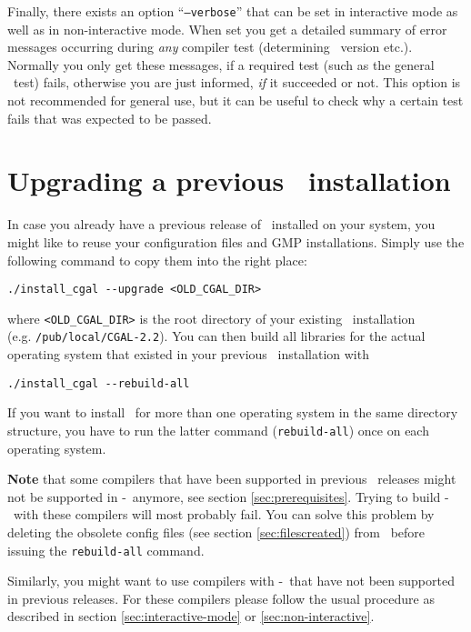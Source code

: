 Finally, there exists an option
``\texttt{--verbose}'' that
can be set in interactive mode as well as in non-interactive mode.
When set you get a detailed summary of error messages occurring during
\textit{any} compiler test (determining \stl\ version etc.). Normally
you only get these messages, if a required test (such as the general
\stl\ test) fails, otherwise you are just informed, \textit{if} it
succeeded or not.  This option is not recommended for general use, but
it can be useful to check why a certain test fails that was expected
to be passed.

\section{Upgrading a previous \cgal\ installation}
\label{sec:upgrade}

In case you already have a previous release of \cgal\ installed on
your system, you might like to reuse your configuration files and GMP
installations. Simply use the following command to copy them into the
right place:
\begin{verbatim}
./install_cgal --upgrade <OLD_CGAL_DIR>
\end{verbatim}
where \texttt{<OLD\_CGAL\_DIR>} is the root directory of your existing
\cgal\ installation\\ (e.g. \texttt{/pub/local/CGAL-2.2}).  You can
then build all libraries for the actual operating system that existed
in your previous \cgal\ installation with
\begin{verbatim}
./install_cgal --rebuild-all
\end{verbatim}

If you want to install \cgal\ for more than one operating system in
the same directory structure, you have to run the latter command
(\texttt{rebuild-all}) once on each operating system.

\textbf{Note} that some compilers that have been supported in previous
\cgal\ releases might not be supported in \cgal-\cgalrelease\ anymore,
see section \ref{sec:prerequisites}. Trying to build
\cgal-\cgalrelease\ with these compilers will most probably fail. You
can solve this problem by deleting the obsolete config files (see
section \ref{sec:filescreated}) from \cgalinstconfdir\ before issuing
the \texttt{rebuild-all} command.

Similarly, you might want to use compilers with \cgal-\cgalrelease\ 
that have not been supported in previous releases. For these compilers
please follow the usual procedure as described in section
\ref{sec:interactive-mode} or \ref{sec:non-interactive}.


